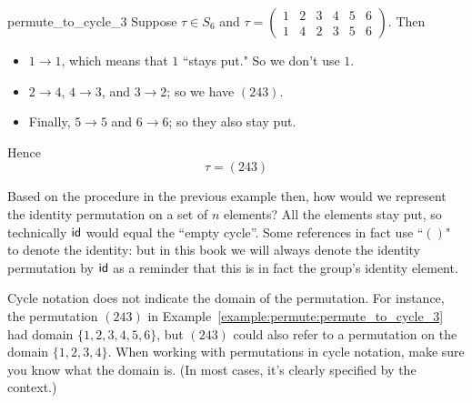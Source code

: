 \begin{example}{permute_to_cycle_3}
Suppose $\tau \in S_6$ and $\tau  = \begin{pmatrix} 1 & 2 & 3 & 4 & 5 & 6 \\ 1 & 4 & 2 & 3 & 5 & 6 \end{pmatrix}$.  Then
\begin{itemize}
\item
$1 \to 1$, which means that $1$ ``stays put."  So we don't use $1$.
\item
$2 \to 4$, $4 \to 3$, and $3 \to 2$; so we have $(243)$.
\item
Finally, $5 \to 5$ and $6 \to 6$; so they also stay put.
\end{itemize}
Hence 
\[
\tau = (243) \]
\end{example}

Based on the procedure in the previous example then, how would we represent the identity permutation on a set of $n$ elements?  All the elements stay put, so technically ${\sf{i}d}$ would equal the ``empty cycle''.  Some references in fact use  ``$()$" to denote the identity: but in this book we will always denote
the identity permutation  by ${\sf{i}d}$ as a reminder that this is in fact the group's identity element.

\begin{warn}\label{cycle_domain}
Cycle notation does not indicate the domain of the permutation. For instance, the permutation $(243)$ in Example~\ref{example:permute:permute_to_cycle_3} had domain $\{1,2,3,4,5,6\}$, but  $(243)$ could also refer to a permutation on the domain $\{1,2,3,4\}$. When working with permutations in cycle notation, make sure you know what the domain is. (In most cases, it's clearly specified by the context.)
\end{warn}

